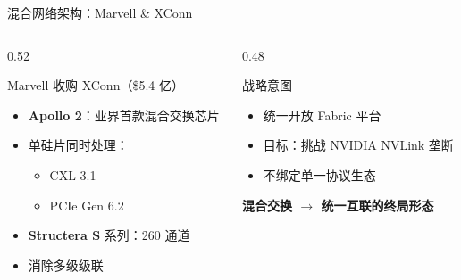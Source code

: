 \documentclass[aspectratio=169, 10pt, UTF8]{ctexbeamer}
\begin{document}
\begin{frame}{混合网络架构：Marvell \& XConn}
  \begin{columns}[T]
    \begin{column}{0.52\textwidth}
      \begin{block}{Marvell 收购 XConn（\$5.4 亿）}
        \begin{itemize}
          \item \textbf{Apollo 2}：业界首款混合交换芯片
          \item 单硅片同时处理：
          \begin{itemize}
            \item CXL 3.1
            \item PCIe Gen 6.2
          \end{itemize}
          \item \textbf{Structera S} 系列：260 通道
          \item 消除多级级联
        \end{itemize}
      \end{block}
    \end{column}
    \begin{column}{0.48\textwidth}
      \begin{alertblock}{战略意图}
        \begin{itemize}
          \item 统一开放 Fabric 平台
          \item 目标：挑战 NVIDIA NVLink 垄断
          \item 不绑定单一协议生态
        \end{itemize}
      \end{alertblock}

      \vspace{10pt}
      \begin{center}
        \textbf{混合交换 $\to$ 统一互联的终局形态}
      \end{center}
    \end{column}
  \end{columns}
\end{frame}
\end{document}
